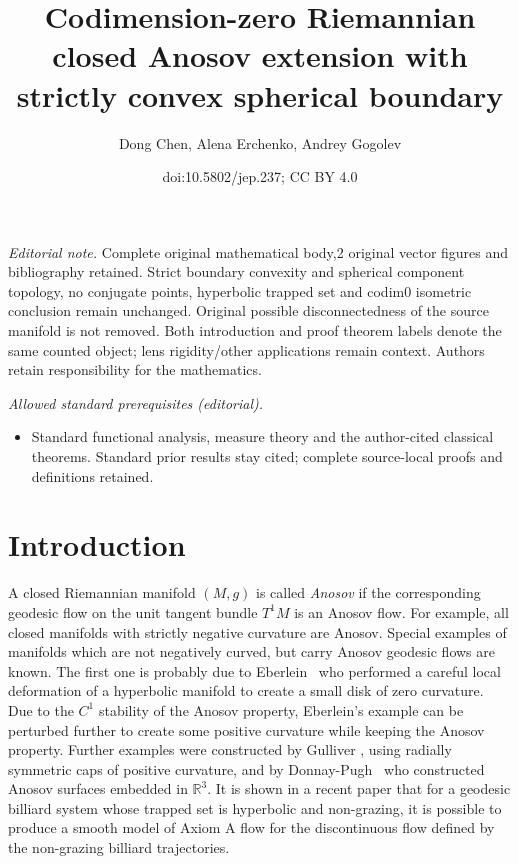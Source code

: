 \documentclass[10pt]{amsart}
\title{Codimension-zero Riemannian closed Anosov extension with strictly convex spherical boundary}
\author{Dong Chen, Alena Erchenko, Andrey Gogolev}
\date{doi:10.5802/jep.237; CC BY 4.0}
\theoremstyle{definition}
\renewcommand{\>}{{\rangle}}
\newcommand{\<}{{\langle}}
\providecommand{\mainmatter}{}\providecommand{\backmatter}{}
\begin{document}
\maketitle
\noindent\textit{Editorial note.} Complete original mathematical body,2 original vector figures and bibliography retained. Strict boundary convexity and spherical component topology, no conjugate points, hyperbolic trapped set and codim0 isometric conclusion remain unchanged. Original possible disconnectedness of the source manifold is not removed. Both introduction and proof theorem labels denote the same counted object; lens rigidity/other applications remain context. Authors retain responsibility for the mathematics.\par\medskip
\noindent\textit{Allowed standard prerequisites (editorial).}\begin{itemize}
\item Standard functional analysis, measure theory and the author-cited classical theorems. Standard prior results stay cited; complete source-local proofs and definitions retained.
\end{itemize}\medskip
\vspace*{-\baselineskip}
\tableofcontents
\mainmatter

\section{Introduction}

A closed Riemannian manifold $(M,g)$ is called {\it Anosov} if the corresponding geodesic flow on the unit tangent bundle $T^1M$ is an Anosov flow. For example, all closed manifolds with strictly negative curvature are Anosov. Special examples of manifolds which are not negatively curved, but carry Anosov geodesic flows are known. The first one is probably due to Eberlein~\cite{E73} who performed a careful local deformation of a hyperbolic manifold to create a small disk of zero curvature. Due to the $C^1$ stability of the Anosov property, Eberlein's example can be perturbed further to create some positive curvature while keeping the Anosov property. Further examples were constructed by Gulliver \cite{G75}, using radially symmetric caps of positive curvature, and by Donnay-Pugh~\cite{DP03} who constructed Anosov surfaces embedded in $\mathbb R^3$. It is shown in a recent paper \cite{DSW21} that for a geodesic billiard system whose trapped set is hyperbolic and non-grazing, it is possible to produce a smooth model of Axiom A ﬂow for the discontinuous ﬂow deﬁned by the non-grazing billiard trajectories.
\end{document}
